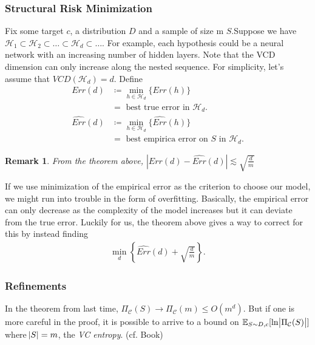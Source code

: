 \documentclass[12pt, letterpaper]{article}
\numberwithin{equation}{section} %
\newcommand{\mb}{\mathbb}
\newcommand{\mc}{\mathcal}
\newtheorem{remark}[theorem]{Remark}
\theoremstyle{definition}
\theoremstyle{remark}
\begin{document}
\subsubsection{Structural Risk Minimization}
Fix some target $c$, a distribution $D$ and a sample of size m $S$.Suppose we have $\mc H_1 \subset \mc H_2 \subset \ldots \subset \mc H_d \subset \ldots$. For example, each hypothesis could be a neural network with an increasing number of hidden layers. Note that the VCD dimension can only increase along the nested sequence. For simplicity, let's assume that $VCD(\mc H_d) = d$. Define
\begin{align}
    Err(d) &\coloneqq \min\limits_{h \in \mc H_d}\lbrace Err(h) \rbrace \\
    &=\textrm{ best true error in $\mc H_d$}.\\
    \widehat{Err}(d) &\coloneqq \min\limits_{h \in \mc H_d}\lbrace \widehat{Err}(h) \rbrace \\
        &=\textrm{ best empirica error on $S$ in $\mc H_d$}.
\end{align}
\begin{remark}
    From the theorem above, $|Err(d)-\widehat{Err}(d)|\lesssim \sqrt{\frac dm}$
\end{remark}

If we use minimization of the empirical error as the criterion to choose our model, we might run into trouble in the form of overfitting. Basically, the empirical error can only decrease as the complexity of the model increases but it can deviate from the true error. Luckily for us, the theorem above gives a way to correct for this by instead finding
\begin{align}
    \min\limits_d\left\{\widehat{Err}(d) + \sqrt{\frac dm}\right\}.
\end{align}

\subsubsection{Refinements}
In the theorem from last time, $\Pi_{\mc C}(S) \rightarrow \Pi_{\mc C}(m) \leq O(m^d)$. But if one is more careful in the proof, it is possible to arrive to a bound on $\mb E_{S\sim D, c}[\ln \abs{\Pi_{\mc C}(S)}]$ where $\abs{S}=m$, the \emph{VC entropy}. (cf. Book)
\end{document}
